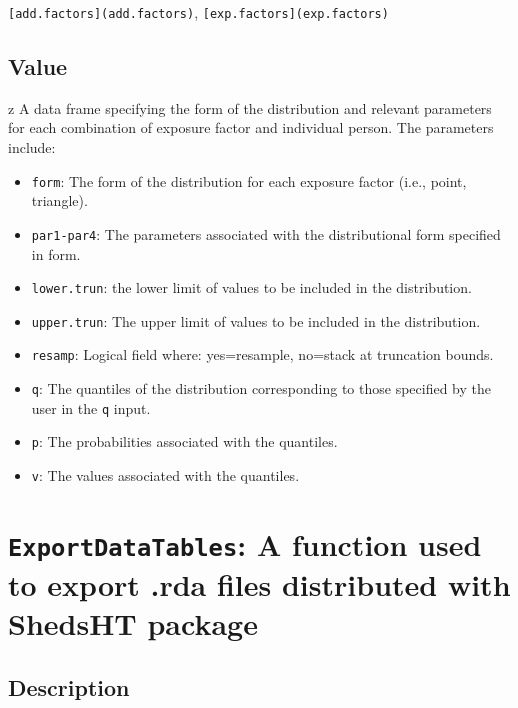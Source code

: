 \documentclass[
]{article}
\providecommand{\tightlist}{%
  \setlength{\itemsep}{0pt}\setlength{\parskip}{0pt}}
\begin{document}
\texttt{{[}add.factors{]}(add.factors)},
\texttt{{[}exp.factors{]}(exp.factors)}

\hypertarget{value-14}{%
\subsection{Value}\label{value-14}}

z A data frame specifying the form of the distribution and relevant
parameters for each combination of exposure factor and individual
person. The parameters include:

\begin{itemize}
\tightlist
\item
  \texttt{form}: The form of the distribution for each exposure factor
  (i.e., point, triangle).
\item
  \texttt{par1-par4}: The parameters associated with the distributional
  form specified in form.
\item
  \texttt{lower.trun}: the lower limit of values to be included in the
  distribution.
\item
  \texttt{upper.trun}: The upper limit of values to be included in the
  distribution.
\item
  \texttt{resamp}: Logical field where: yes=resample, no=stack at
  truncation bounds.
\item
  \texttt{q}: The quantiles of the distribution corresponding to those
  specified by the user in the \texttt{q} input.
\item
  \texttt{p}: The probabilities associated with the quantiles.
\item
  \texttt{v}: The values associated with the quantiles.
\end{itemize}

\hypertarget{exportdatatables-a-function-used-to-export-.rda-files-distributed-with-shedsht-package}{%
\section{\texorpdfstring{\texttt{ExportDataTables}: A function used to
export .rda files distributed with ShedsHT
package}{ExportDataTables: A function used to export .rda files distributed with ShedsHT package}}\label{exportdatatables-a-function-used-to-export-.rda-files-distributed-with-shedsht-package}}

\hypertarget{description-20}{%
\subsection{Description}\label{description-20}}
\end{document}
